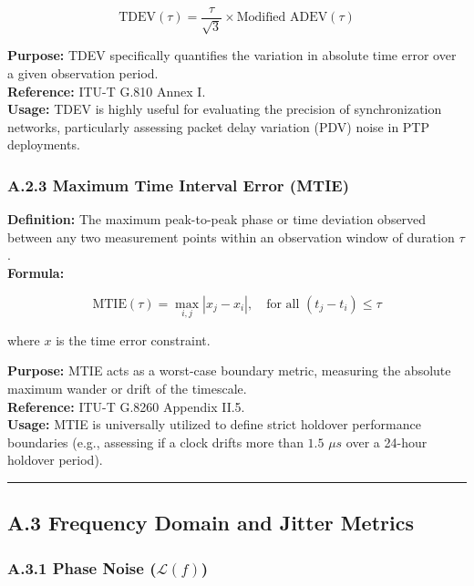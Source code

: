 \documentclass[
]{article}
\begin{document}
\[\text{TDEV}(\tau) = \frac{\tau}{\sqrt{3}} \times \text{Modified ADEV}(\tau)\]

\textbf{Purpose:} TDEV specifically quantifies the variation in absolute
time error over a given observation period.\\
\textbf{Reference:} ITU-T G.810 Annex I.\\
\textbf{Usage:} TDEV is highly useful for evaluating the precision of
synchronization networks, particularly assessing packet delay variation
(PDV) noise in PTP deployments.

\subsubsection{A.2.3 Maximum Time Interval Error
(MTIE)}\label{a.2.3-maximum-time-interval-error-mtie}

\textbf{Definition:} The maximum peak-to-peak phase or time deviation
observed between any two measurement points within an observation window
of duration \(\tau\).\\
\textbf{Formula:}

\[\text{MTIE}(\tau) = \max_{i,j} |x_j - x_i|, \quad \text{for all } (t_j - t_i) \le \tau\]

where \(x\) is the time error constraint.

\textbf{Purpose:} MTIE acts as a worst-case boundary metric, measuring
the absolute maximum wander or drift of the timescale.\\
\textbf{Reference:} ITU-T G.8260 Appendix II.5.\\
\textbf{Usage:} MTIE is universally utilized to define strict holdover
performance boundaries (e.g., assessing if a clock drifts more than
\(1.5\) \(\mu s\) over a 24-hour holdover period).

\begin{center}\rule{0.5\linewidth}{0.5pt}\end{center}

\subsection{A.3 Frequency Domain and Jitter
Metrics}\label{a.3-frequency-domain-and-jitter-metrics}

\subsubsection{\texorpdfstring{A.3.1 Phase Noise
(\(\mathcal{L}(f)\))}{A.3.1 Phase Noise (\textbackslash mathcal\{L\}(f))}}\label{a.3.1-phase-noise-mathcallf}
\end{document}
